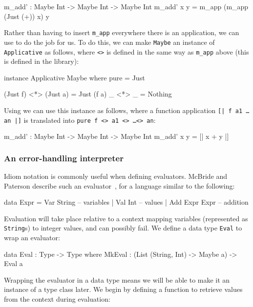 \begin{code}
m_add' : Maybe Int -> Maybe Int -> Maybe Int
m_add' x y = m_app (m_app (Just (+)) x) y
\end{code} 

\noindent
Rather than having to insert \texttt{m\_app} everywhere there is an
application, we can use  to do the job for us.  To do
this, we can make \texttt{Maybe} an instance of \texttt{Applicative} as
follows, where \texttt{<\*>} is defined in the same way as \texttt{m\_app}
above (this is defined in the \Idris{} library):

\begin{code}
instance Applicative Maybe where
    pure = Just

    (Just f) <*> (Just a) = Just (f a)
    _        <*> _        = Nothing
\end{code} 

\noindent
Using  we can use this instance as follows, where a
function application \texttt{[| f a1 \dots an |]} is translated into
\texttt{pure f <\*> a1 <\*> \dots <\*> an}:

\begin{code}
m_add' : Maybe Int -> Maybe Int -> Maybe Int
m_add' x y = [| x + y |]
\end{code} 

\subsubsection{An error-handling interpreter}

Idiom notation is commonly useful when defining evaluators.
McBride and Paterson describe such an evaluator~\cite{idioms}, for a language similar to the following:

\begin{code}
data Expr = Var String      -- variables
          | Val Int         -- values
          | Add Expr Expr   -- addition
\end{code} 

\noindent
Evaluation will take place relative to a context mapping variables (represented as \texttt{String}s) to integer values, and can possibly fail.
We define a data type \texttt{Eval} to wrap an evaluator:

\begin{code}
data Eval : Type -> Type where
     MkEval : (List (String, Int) -> Maybe a) -> Eval a
\end{code} 

\noindent
Wrapping the evaluator in a data type means we will be able to make it an instance of a type class later. We begin by defining a function to retrieve values from the context during evaluation:

